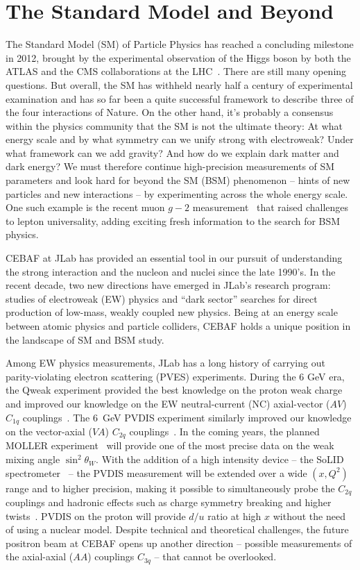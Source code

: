 \section{ The Standard Model and Beyond} 
\label{sec:BSM}

The Standard Model (SM) of Particle Physics has reached a concluding milestone in 2012, brought by the experimental observation of the Higgs boson by both the ATLAS and the CMS collaborations at the LHC~\cite{Aaboud:2018zhk,Sirunyan:2018kst}. 
%
There are still many opening questions. But overall, the SM has withheld nearly half a century of experimental examination and has so far been a quite successful framework to describe three of the four interactions of Nature. 
On the other hand, it's probably a consensus within the physics community that the SM is not the ultimate theory: At what energy scale and by what symmetry can we unify strong with electroweak? Under what framework can we add gravity? And how do we explain dark matter and dark energy?  We must therefore continue high-precision measurements of SM parameters and look hard for beyond the SM (BSM) phenomenon -- hints of new particles and new interactions -- by experimenting across the whole energy scale. One such example is the recent muon $g-2$ measurement~\cite{PhysRevLett.126.141801} that raised challenges to lepton universality, adding exciting fresh information to the search for BSM physics. 
  

CEBAF at JLab has provided an essential tool in our pursuit of understanding the strong interaction and the nucleon and nuclei since the late 1990's. In the recent decade, two new directions have emerged in JLab's research program: studies of electroweak (EW) physics and ``dark sector'' searches for direct production of low-mass, weakly coupled new physics. Being at an energy scale between atomic physics and particle colliders, CEBAF holds a unique position in the landscape of SM and BSM study. 

Among EW physics measurements, JLab has a long history of carrying out parity-violating electron scattering (PVES) experiments. During the 6 GeV era, the Qweak experiment provided the best knowledge on the proton weak charge and improved our knowledge on the EW neutral-current (NC) axial-vector ($AV$) $C_{1q}$ couplings~\cite{Androic:2013rhu,Androic:2018kni}. The 6~GeV PVDIS experiment similarly improved our knowledge on the vector-axial ($VA$) $C_{2q}$ couplings~\cite{Wang:2014bba,Wang:2014guo}. In the coming years, the planned MOLLER experiment~\cite{Benesch:2014bas} will provide one of the most precise data on the weak mixing angle $\sin^2\theta_W$. 
%
With the addition of a high intensity device -- the SoLID spectrometer~\cite{Chen:2014psa} -- the PVDIS measurement will be extended over a wide $(x,Q^2)$ range and to higher precision, making it possible to simultaneously probe the $C_{2q}$ couplings and hadronic effects such as charge symmetry breaking and higher twists~\cite{PVDIS}. PVDIS on the proton will provide $d/u$ ratio at high $x$ without the need of using a nuclear model. Despite technical and theoretical challenges, the future positron beam at CEBAF opens up another direction -- possible measurements of the axial-axial ($AA$) couplings $C_{3q}$ -- that cannot be overlooked.

